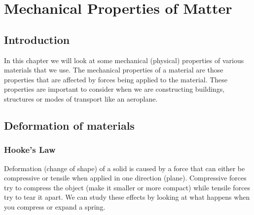 \chapter{Mechanical Properties of Matter}
\label{p:mm:ep12}

\section {Introduction}

In this chapter we will look at some mechanical (physical) properties of various materials that we use. The mechanical properties of a material are those properties that are affected by forces being applied to the material. These properties are important to consider when we are constructing buildings, structures or modes of transport like an aeroplane.
\section{Deformation of materials}

\subsection{Hooke's Law}

Deformation (change of shape) of a solid is caused by a force that can either be compressive or tensile when applied in one direction (plane). Compressive forces try to compress the object (make it smaller or more compact) while tensile forces try to tear it apart.
We can study these effects by looking at what happens when you compress or expand a spring.
 
